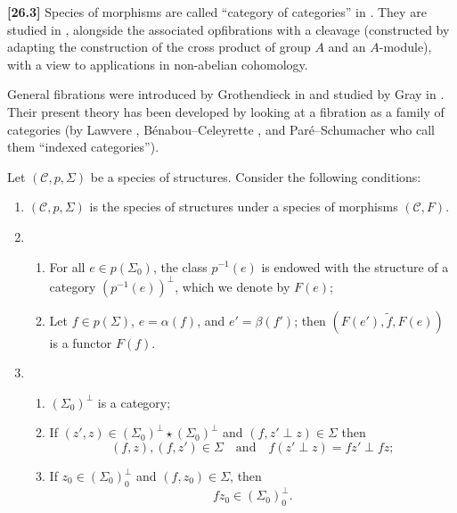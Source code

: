 \documentclass[a4paper,fleqn]{article}
\theoremstyle{plain}
\theoremstyle{definition}
\newenvironment{longcomm}[1]
  {\noindent\textbf{[#1]}\rmfamily}
  {}
\newcommand{\oldpage}[1]{{\marginpar{\footnotesize$\bigg\vert$\,\,\,\,\textit{p.~#1}}}}
\newcommand{\textand}{\quad\text{and}\quad}
\newcommand{\CC}{\mathcal{C}}
\begin{document}
\begin{longcomm}{26.3}
  Species of morphisms are called ``category of categories'' in \cite{comm28}.
  They are studied in \cite{coll70,coll77,coll122}, alongside the associated opfibrations with a cleavage (constructed by adapting the construction of the cross product of group $A$ and an $A$-module), with a view to applications in non-abelian cohomology.

  General fibrations were introduced by Grothendieck in \cite{comm43} and studied by Gray in \cite{comm38}.
  Their present theory has been developed by looking at a fibration as a family of categories (by Lawvere \cite{comm65}, Bénabou--Celeyrette \cite{comm8,comm19}, and Paré--Schumacher \cite{comm82} who call them ``indexed categories'').
\end{longcomm}

Let $(\CC,p,\Sigma)$ be a species of structures.
Consider the following conditions:
\begin{enumerate}
  \item[(a)]
    $(\CC,p,\Sigma)$ is the species of structures under a species of morphisms $(\CC,F)$.
  \oldpage{355}
  \item[(b)]
    \begin{enumerate}
      \item[(b\textsubscript{1})]
        For all $e\in p(\Sigma_0)$, the class $p^{-1}(e)$ is endowed with the structure of a category $(p^{-1}(e))^\perp$, which we denote by $F(e)$;
      \item[(b\textsubscript{2})]
        Let $f\in p(\Sigma)$, $e=\alpha(f)$, and $e'=\beta(f')$;
        then $(F(e'),\widetilde{f},F(e))$ is a functor $F(f)$.
    \end{enumerate}
  \item[(c)]
    \begin{enumerate}
      \item[(c\textsubscript{1})]
        $(\Sigma_0)^\perp$ is a category;
      \item[(c\textsubscript{2})]
        If $(z',z)\in(\Sigma_0)^\perp\star(\Sigma_0)^\perp$ and $(f,z'\perp z)\in\Sigma$ then
        \[
          (f,z),(f,z')\in\Sigma
          \textand
          f(z'\perp z)=fz'\perp fz;
        \]
      \item[(c\textsubscript{3})]
        If $z_0\in(\Sigma_0)_0^\perp$ and $(f,z_0)\in\Sigma$, then
        \[
          fz_0\in(\Sigma_0)_0^\perp.
        \]
    \end{enumerate}
\end{enumerate}
\end{document}
